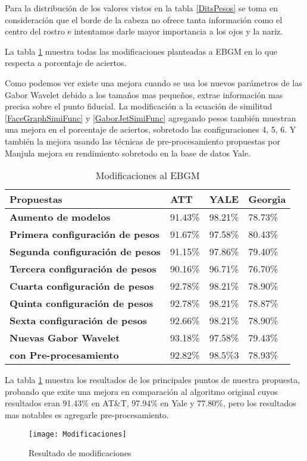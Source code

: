 Para la distribución de los valores vistos en la tabla \ref{DitsPesos} se toma en consideración que el borde de la cabeza no ofrece tanta información como el centro del rostro e intentamos darle mayor importancia a los ojos y la nariz.





La tabla \ref{Resultados} muestra todas las modificaciones planteadas a \ac{EBGM} en lo que respecta a porcentaje de aciertos.\par 
Como podemos ver existe una mejora cuando se usa los nuevos parámetros de las Gabor Wavelet debido a los tamaños mas pequeños, extrae información mas precisa sobre el punto fiducial.
La modificación a la ecuación de similitud \ref{FaceGraphSimiFunc} y \ref{GaborJetSimiFunc} agregando pesos también muestran una mejora en el porcentaje de aciertos, sobretodo las configuraciones 4, 5, 6.
Y también la mejora usando las técnicas de pre-procesamiento propuestas por Manjula\cite{manjulaimage} mejora su rendimiento sobretodo en la base de datos Yale. 

\begin{table}[!h]
\centering
\caption{Modificaciones al \ac{EBGM}}
\label{Resultados}
\begin{tabular}{|l|l|l|l|}
\hline
\textbf{Propuestas}                     & \textbf{ATT} & \textbf{YALE} & \textbf{Georgia} \\ \hline
\textbf{Aumento de modelos}                    & 91.43\%      & 98.21\%       & 78.73\%          \\ \hline
\textbf{Primera configuración de pesos} & 91.67\%      & 97.58\%       & 80.43\%          \\ \hline
\textbf{Segunda configuración de pesos} & 91.15\%      & 97.86\%       & 79.40\%          \\ \hline
\textbf{Tercera configuración de pesos} & 90.16\%      & 96.71\%       & 76.70\%          \\ \hline
\textbf{Cuarta configuración de pesos}  & 92.78\%      & 98.21\%       & 78.90\%          \\ \hline
\textbf{Quinta configuración de pesos}  & 92.78\%      & 98.21\%       & 78.87\%          \\ \hline
\textbf{Sexta configuración de pesos}   & 92.66\%      & 98.21\%       & 78.90\%          \\ \hline
\textbf{Nuevas Gabor Wavelet}       & 93.18\%      & 97.58\%       & 79.43\%          \\ \hline
\textbf{con Pre-procesamiento}     & 92.82\%      & 98.5\%3       & 78.93\%          \\ \hline
\end{tabular}
\end{table}
La tabla \ref{Resultados} muestra los resultados de los principales puntos de nuestra propuesta, probando que exite una mejora en comparación al algoritmo original cuyos resultados eran 91.43\% en AT\&T, 97.94\% en Yale y 77.80\%, pero los resultados mas notables es agregarle pre-procesamiento.
\begin{figure}
	\centering
	\texttt{[image: Modificaciones]}
    \caption{Resultado de modificaciones}
\end{figure}

